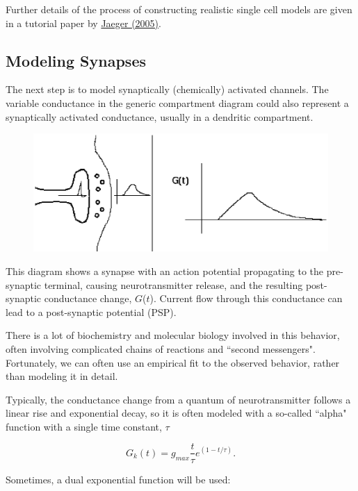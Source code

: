 \documentclass[12pt]{article}
\begin{document}
Further details of the process of constructing realistic single cell models are given in a tutorial paper by \href{../tutorial-jaeger/tutorial-jaeger.pdf}{Jaeger (2005)}.

\subsection*{Modeling Synapses}

The next step is to model synaptically (chemically) activated channels. The variable conductance in the generic compartment diagram could also represent a synaptically activated conductance, usually in a dendritic compartment.

\begin{figure}[h]
  \centering
 \includegraphics[scale=0.5]{figs/syncond.eps}
  \label{fig:purkinj5}
\end{figure}

This diagram shows a synapse with an action potential propagating to the pre-synaptic terminal, causing neurotransmitter release, and the resulting post-synaptic conductance change, $G$($t$). Current flow through this conductance can lead to a post-synaptic potential (PSP).

There is a lot of biochemistry and molecular biology involved in this behavior, often involving complicated chains of reactions and ``second messengers". Fortunately, we can often use an empirical fit to the observed behavior, rather than modeling it in detail.

Typically, the conductance change from a quantum of neurotransmitter follows a linear rise and exponential decay, so it is often modeled with a so-called ``alpha" function with a single time constant, $\tau$

\begin{displaymath}
	G_k(t) = g_{max}\frac{t}{\tau}e^{(1-t/\tau)}.
\end{displaymath}

Sometimes, a dual exponential function will be used:
\end{document}
